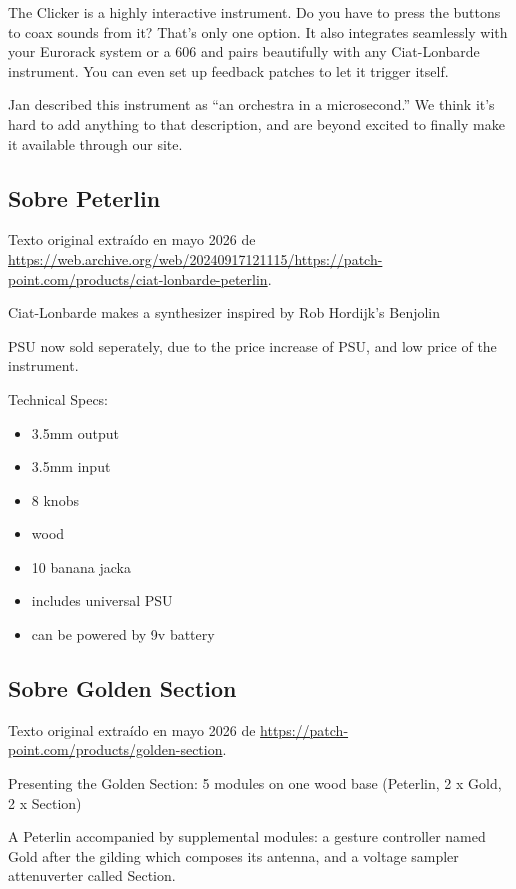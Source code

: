 The Clicker is a highly interactive instrument. Do you have to press the buttons to coax sounds from it? That's only one option. It also integrates seamlessly with your Eurorack system or a 606 and pairs beautifully with any Ciat-Lonbarde instrument. You can even set up feedback patches to let it trigger itself.

Jan described this instrument as “an orchestra in a microsecond.” We think it's hard to add anything to that description, and are beyond excited to finally make it available through our site.

\newpage

\subsection{Sobre Peterlin}

Texto original extraído en mayo 2026 de \url{https://web.archive.org/web/20240917121115/https://patch-point.com/products/ciat-lonbarde-peterlin}.

Ciat-Lonbarde makes a synthesizer inspired by Rob Hordijk's Benjolin

PSU now sold seperately, due to the price increase of PSU, and low price of the instrument.

Technical Specs:


\begin{itemize}
	\item 3.5mm output
	\item 3.5mm input
	\item 8 knobs
	\item wood
	\item 10 banana jacka
	\item includes universal PSU
	\item can be powered by 9v battery
\end{itemize}


\newpage

\subsection{Sobre Golden Section}

Texto original extraído en mayo 2026 de \url{https://patch-point.com/products/golden-section}.

Presenting the Golden Section: 5 modules on one wood base (Peterlin, 2 x Gold, 2 x Section)

A Peterlin accompanied by supplemental modules: a gesture controller named Gold after the gilding which composes its antenna, and a voltage sampler attenuverter called Section.

